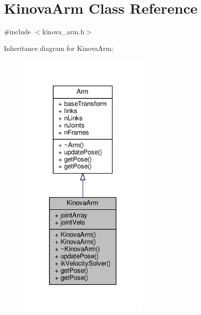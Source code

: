 \hypertarget{class_kinova_arm}{}\section{Kinova\+Arm Class Reference}
\label{class_kinova_arm}


{\ttfamily \#include $<$kinova\+\_\+arm.\+h$>$}



Inheritance diagram for Kinova\+Arm\+:
\nopagebreak
\begin{figure}[H]
\begin{center}
\leavevmode
\includegraphics[width=182pt]{class_kinova_arm__inherit__graph}
\end{center}
\end{figure}


